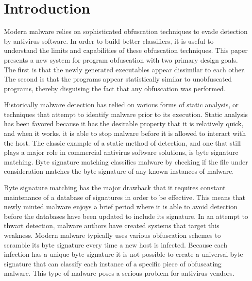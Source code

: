 \chapter{Introduction}

    Modern malware relies on sophisticated obfuscation techniques to evade
    detection by antivirus software. In order to build better classifiers, it is
    useful to understand the limits and capabilities of these obfuscation
    techniques. This paper presents a new system for program obfuscation with
    two primary design goals. The first is that the newly generated executables
    appear dissimilar to each other. The second is that the programs appear
    statistically similar to unobfuscated programs, thereby disguising the fact
    that any obfuscation was performed.




    Historically malware detection has relied on various forms of static
    analysis, or techniques that attempt to identify malware prior to its
    execution.  Static analysis has been favored because it has the desirable
    property that it is relatively quick, and when it works, it is able to stop
    malware before it is allowed to interact with the host. The classic example
    of a static method of detection, and one that still plays a major role in
    commercial antivirus software solutions, is byte signature matching.  Byte
    signature matching classifies malware by checking if the file under
    consideration matches the byte signature of any known instances of malware.


    Byte signature matching has the major drawback that it requires constant
    maintenance of a database of signatures in order to be effective. This means
    that newly minted malware enjoys a brief period where it is able to avoid
    detection before the databases have been updated to include its signature.
    In an attempt to thwart detection, malware authors have created systems that
    target this weakness. Modern malware typically uses various obfuscation
    schemes to scramble its byte signature every time a new host is infected.
    Because each infection has a unique byte signature it is not possible to
    create a universal byte signature that can classify each instance of a
    specific piece of obfuscating malware. This type of malware poses a serious
    problem for antivirus vendors.

